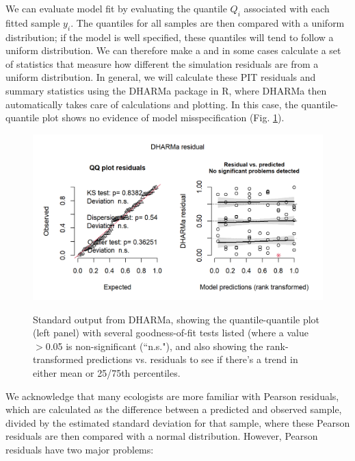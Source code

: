We can evaluate model fit by evaluating the quantile \(Q_i\) associated with each fitted sample \(y_i\). The quantiles for all samples are then compared with a uniform distribution; if the model is well specified, these quantiles will tend to follow a uniform distribution. We can therefore make a  and in some cases calculate a set of statistics that measure how different the simulation residuals are from a uniform distribution. In general, we will calculate these PIT residuals and summary statistics using the \colorbox{backcolour}{DHARMa} package \cite{hartig_dharma_2017} in R, where DHARMa then automatically takes care of calculations and plotting. In this case, the quantile-quantile plot shows no evidence of model misspecification (Fig. \ref{fig:Chap1_DHARMa_example}).  

\lstset{style=Rcode}


\begin{figure}[!ht]
    \caption[Example of quantile-quantile residuals]{Standard output from DHARMa, showing the quantile-quantile plot (left panel) with several goodness-of-fit tests listed (where a value $>$0.05 is non-significant (``n.s."), and also showing the rank-transformed predictions vs. residuals to see if there's a trend in either mean or 25/75th percentiles.}
    \centering
    \includegraphics[width=5.5in]{Chap_1/DHARMa_residuals_res50.png}
    \label{fig:Chap1_DHARMa_example}
\end{figure}

We acknowledge that many ecologists are more familiar with Pearson residuals, which are calculated as the difference between a predicted and observed sample, divided by the estimated standard deviation for that sample, where these Pearson residuals are then compared with a normal distribution.  However, Pearson residuals have two major problems:

